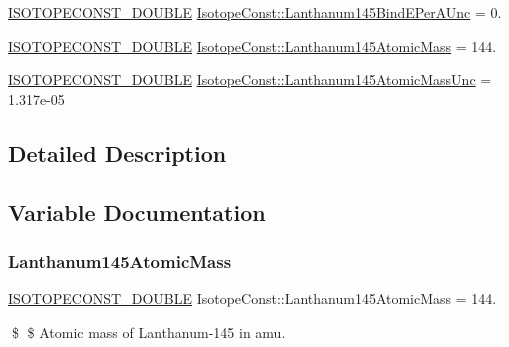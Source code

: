 \begin{DoxyCompactItemize}
\mbox{\hyperlink{group___isotope_const-_macros_ga8f45a7272ce02c0b4c65c44636ed719a}{I\+S\+O\+T\+O\+P\+E\+C\+O\+N\+S\+T\+\_\+\+D\+O\+U\+B\+LE}} \mbox{\hyperlink{group___isotope_const-_lanthanum-_la145_ga94f26e83794344b8c57fdfa7f09dab63}{Isotope\+Const\+::\+Lanthanum145\+Bind\+E\+Per\+A\+Unc}} = 0.
\item 
\mbox{\hyperlink{group___isotope_const-_macros_ga8f45a7272ce02c0b4c65c44636ed719a}{I\+S\+O\+T\+O\+P\+E\+C\+O\+N\+S\+T\+\_\+\+D\+O\+U\+B\+LE}} \mbox{\hyperlink{group___isotope_const-_lanthanum-_la145_ga138da6dc8b7b7648d92c62b35b3dcb27}{Isotope\+Const\+::\+Lanthanum145\+Atomic\+Mass}} = 144.
\item 
\mbox{\hyperlink{group___isotope_const-_macros_ga8f45a7272ce02c0b4c65c44636ed719a}{I\+S\+O\+T\+O\+P\+E\+C\+O\+N\+S\+T\+\_\+\+D\+O\+U\+B\+LE}} \mbox{\hyperlink{group___isotope_const-_lanthanum-_la145_gabcdba022e935660eb92f8e63557a77b9}{Isotope\+Const\+::\+Lanthanum145\+Atomic\+Mass\+Unc}} = 1.\+317e-\/05
\end{DoxyCompactItemize}


\subsection{Detailed Description}


\subsection{Variable Documentation}
\mbox{\label{group___isotope_const-_lanthanum-_la145_ga138da6dc8b7b7648d92c62b35b3dcb27}} 
\subsubsection{\texorpdfstring{Lanthanum145\+Atomic\+Mass}{Lanthanum145AtomicMass}}
{\footnotesize\ttfamily \mbox{\hyperlink{group___isotope_const-_macros_ga8f45a7272ce02c0b4c65c44636ed719a}{I\+S\+O\+T\+O\+P\+E\+C\+O\+N\+S\+T\+\_\+\+D\+O\+U\+B\+LE}} Isotope\+Const\+::\+Lanthanum145\+Atomic\+Mass = 144.}

\$ \$ Atomic mass of Lanthanum-\/145 in amu. \mbox{\label{group___isotope_const-_lanthanum-_la145_gabcdba022e935660eb92f8e63557a77b9}} 
